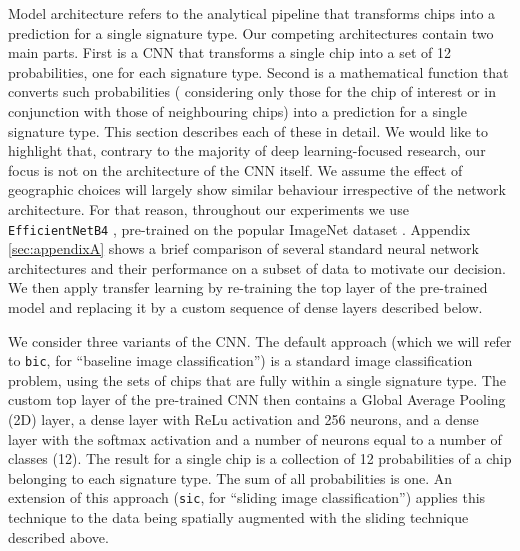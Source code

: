 Model architecture refers to the analytical pipeline that transforms chips
into a prediction for a single signature type. Our competing architectures
contain two main parts. First is a CNN that transforms a single chip into a
set of 12 probabilities, one for each signature type.
Second is a mathematical function that converts such probabilities (
considering only those for the chip of interest or in conjunction with
those of neighbouring chips) into a
prediction for a single signature type. This section describes each of these in detail.
We would like to highlight that, contrary to the majority of deep
learning-focused research, our focus is not on the architecture of the CNN
itself. We assume the effect of geographic choices will largely show similar
behaviour irrespective of the network architecture. For that reason, throughout
our experiments we use \texttt{EfficientNetB4} \citep{https://doi.org/10.48550/arxiv.1905.11946}, pre-trained
on the popular ImageNet dataset \citep{deng2009imagenet}. Appendix \ref*{sec:appendixA} shows a brief comparison of
several standard neural network architectures and their performance on a subset of data
to motivate our decision. We then apply transfer learning by re-training the
top layer of the pre-trained model and replacing it by a
custom sequence of dense layers described below.

We consider three variants of the CNN.
The default approach (which we will refer to \texttt{bic}, for ``baseline
image classification'') is a standard image classification problem, using the sets of chips
that are fully within a single signature type. The custom top layer of the pre-trained CNN then contains a Global Average
Pooling (2D) layer, a dense layer with ReLu activation and 256 neurons, and a dense
layer with the softmax activation and a number of neurons equal to a number of classes
(12). The result for a single chip is a collection of 12 probabilities
of a chip belonging to each signature type. The sum of all probabilities is
one.
An extension of this approach (\texttt{sic}, for ``sliding image
classification'') applies this technique to the data being spatially augmented
with the sliding technique described above.

